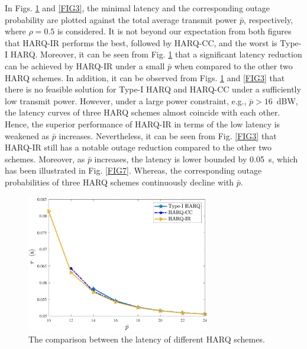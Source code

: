 \documentclass[conference]{IEEEtran}
\begin{document}
In Figs. \ref{FIG4} and \ref{FIG3}, the minimal latency and the corresponding outage probability are plotted against the total average transmit power $\bar p$, respectively, where $\rho=0.5 $ is considered. It is not beyond our expectation from both figures that HARQ-IR performs the best, followed by HARQ-CC, and the worst is Type-I HARQ. Moreover, it can be seen from Fig. \ref{FIG4} that a significant latency reduction can be achieved by HARQ-IR under a small $\bar p$ when compared to the other two HARQ schemes. In addition, it can be observed from Figs. \ref{FIG4} and \ref{FIG3} that there is no feasible solution for Type-I HARQ and HARQ-CC under a sufficiently low transmit power. However, under a large power constraint, e.g., $\bar p>16$~dBW, the latency curves of three HARQ schemes almost coincide with each other. Hence, the superior performance of HARQ-IR in terms of the low latency is weakened as $\bar p$ increases. %
Nevertheless, it can be seen from Fig. \ref{FIG3} that HARQ-IR still has a notable outage reduction compared to the other two schemes. Moreover, as $\bar p$ increases, the latency is lower bounded by 0.05~s, which has been illustrated in Fig. \ref{FIG7}. Whereas, the corresponding outage probabilities of three HARQ schemes continuously decline with $\bar p$.

\begin{figure}[htbp]
    \centering
    \includegraphics[width=8cm]{power-delay.pdf}
    \caption{The comparison between the latency of different HARQ
schemes.}
    \label{FIG4} %
\end{figure}
\end{document}
